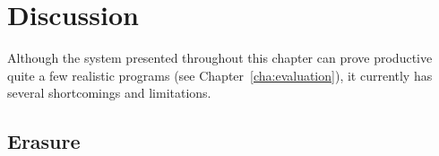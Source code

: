 





\section{Discussion}
\label{sec:discussion}
Although the system presented throughout this chapter can prove productive quite
a few realistic programs (see Chapter~\ref{cha:evaluation}), it currently has
several shortcomings and limitations.

\subsection{Erasure}


